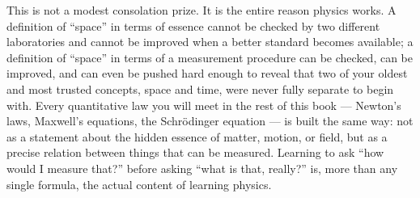 This is not a modest consolation prize. It is the entire reason physics works.
A definition of ``space'' in terms of essence cannot be checked by two
different laboratories and cannot be improved when a better standard becomes
available; a definition of ``space'' in terms of a measurement procedure can be
checked, can be improved, and 
can even be pushed hard enough to reveal that two of your oldest and most
trusted concepts, space and time, were never fully separate to begin with.
Every quantitative law you will meet in the rest of this book --- Newton's
laws, Maxwell's equations, the Schr\"odinger equation --- is built the same
way: not as a statement about the hidden essence of matter, motion, or field,
but as a precise relation between things that can be measured. Learning to ask
``how would I measure that?'' before asking ``what is that, really?'' is, more
than any single formula, the actual content of learning physics.
